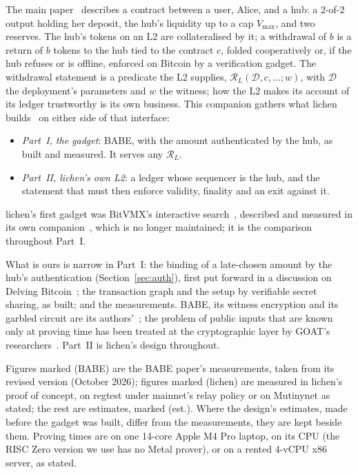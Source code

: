 \documentclass[11pt]{article}
\newcommand{\vmax}{V_{\max}}
\begin{document}
The main paper~\cite{lichen} describes a contract between a user, Alice,
and a hub: a 2-of-2 output holding her deposit, the hub's liquidity up to
a cap $\vmax$, and two reserves. The hub's tokens on an L2 are
collateralised by it; a withdrawal of $b$ is a return of $b$ tokens to
the hub tied to the contract $c$, folded cooperatively or, if the hub
refuses or is offline, enforced on Bitcoin by a verification gadget. The
withdrawal statement is a predicate the L2 supplies,
$\mathcal{R}_L(\mathcal{D}, c, \ldots; w)$, with $\mathcal{D}$ the
deployment's parameters and $w$ the witness; how the L2 makes its
account of its ledger trustworthy is its own business. This companion
gathers what lichen builds~\cite{lichencode} on either side of that
interface:
\begin{itemize}[leftmargin=1.5em]
\item \emph{Part~I, the gadget}: BABE, with the amount authenticated by
  the hub, as built and measured. It serves any $\mathcal{R}_L$.
\item \emph{Part~II, lichen's own L2}: a ledger whose sequencer is the
  hub, and the statement that must then enforce validity, finality and
  an exit against it.
\end{itemize}
lichen's first gadget was BitVMX's interactive search~\cite{bitvmx},
described and measured in its own companion~\cite{lichenbitvmx}, which
is no longer maintained; it is the comparison throughout Part~I.

What is ours is narrow in Part~I: the binding of a late-chosen amount by
the hub's authentication (Section~\ref{sec:auth}), first put forward in a
discussion on Delving Bitcoin~\cite{delving}; the transaction graph and
the setup by verifiable secret sharing, as built; and the measurements.
BABE, its witness encryption and its garbled circuit are its
authors'~\cite{babe,gkpw24,argo}; the problem of public inputs that are
known only at proving time has been treated at the cryptographic layer by
GOAT's researchers~\cite{goat}. Part~II is lichen's design throughout.

Figures marked (BABE) are the BABE paper's measurements, taken from its
revised version (October 2026); figures marked (lichen) are measured in
lichen's proof of concept, on regtest under mainnet's relay policy or on
Mutinynet as stated; the rest are estimates, marked (est.). Where the
design's estimates, made before the gadget was built, differ from the
measurements, they are kept beside them. Proving times are on one
14-core Apple M4 Pro laptop, on its CPU (the RISC Zero version we use
has no Metal prover), or on a rented 4-vCPU x86 server, as stated.
\end{document}
